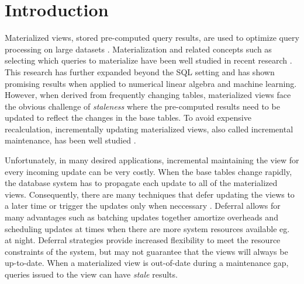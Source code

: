 \section{Introduction}
Materialized views, stored pre-computed query results, are used to optimize query processing on large datasets \cite{gupta1995maintenance, chirkova2011materialized, halevy2001answering}.
Materialization and related concepts such as selecting which queries to materialize
have been well studied in recent research \cite{zaharia2012resilient,lefevre2014opportunistic, bailis2014scalable, perez2014history}.
This research has further expanded beyond the SQL setting \cite{nikolic2014linview} and 
has shown promising results when applied to numerical linear algebra and machine learning.
However, when derived from frequently changing tables,
materialized views face the obvious challenge of \emph{staleness} where the pre-computed results need to be updated to reflect the changes in the base tables.
To avoid expensive recalculation, incrementally updating materialized views,
also called incremental maintenance, has been well studied \cite{gupta1995maintenance, chirkova2011materialized}.

Unfortunately, in many desired applications, incremental maintaining the view for every incoming update can be very costly. 
When the base tables change rapidly, the database system has to propagate each update to all of the materialized views.
Consequently, there are many techniques that defer updating the views to a later time or trigger the updates only when neccessary \cite{chirkova2011materialized, zhou2007lazy}.
Deferral allows for many advantages such as batching updates together amortize overheads and scheduling updates at times when there are more system resources available eg. at night.
Deferral strategies provide increased flexibility to meet the resource constraints of the system, but may not guarantee that the views will always be up-to-date.
When a materialized view is out-of-date during a maintenance gap, queries issued to the view can have \emph{stale} results. 

